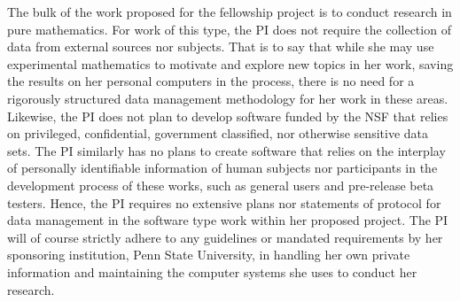 \documentclass[10pt,reqno,letterpaper]{article}
\theoremstyle{plain}
\numberwithin{theorem}{section}
\theoremstyle{definition}
\begin{document}
The bulk of the work proposed for the fellowship project is to conduct research in pure mathematics. 
For work of this type, the PI does not require the collection of data from external sources nor subjects. 
That is to say that while she may use experimental mathematics to motivate and 
explore new topics in her work, saving the results on her personal computers in the process, there is no 
need for a rigorously structured data management methodology for her work in these areas. 
Likewise, the PI does not plan to develop software funded by the NSF that relies on privileged, 
confidential, government classified, nor otherwise sensitive data sets. 
The PI similarly has no plans to create software that relies on the interplay of personally 
identifiable information of human subjects nor participants in the development process of these works, 
such as general users and pre-release beta testers. 
Hence, the PI requires no extensive plans nor statements of protocol for data management in the 
software type work within her proposed project. 
The PI will of course strictly adhere to any guidelines or mandated requirements by her sponsoring 
institution, Penn State University, in handling her own private information and 
maintaining the computer systems she uses to conduct her research.  
\end{document}
